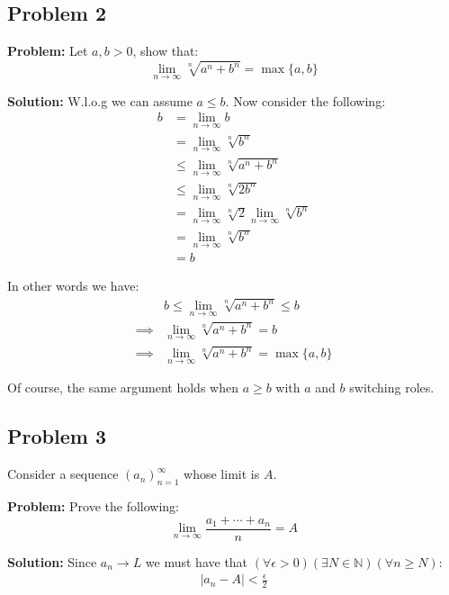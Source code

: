 \documentclass{article}
\newcommand{\N}{\mathbb N}
\begin{document}
\subsection*{Problem 2}
\noindent\textbf{Problem:} Let $a,b>0$, show that:
$$\lim_{n\to\infty}\sqrt[n]{a^n+b^n}=\max\{a,b\}$$

\noindent\textbf{Solution:} W.l.o.g we can assume $a\le b$. Now consider the following:
\begin{align*}
  b&=\lim_{n\to\infty}b\\
  &=\lim_{n\to\infty}\sqrt[n]{b^n}\\
  &\le\lim_{n\to\infty}\sqrt[n]{a^n+b^n}\tag{$a^n+b^n\ge b^n$}\\ 
  &\le\lim_{n\to\infty}\sqrt[n]{2b^n}\tag{$a<b$}\\
  &=\lim_{n\to\infty}\sqrt[n]{2}\lim_{n\to\infty}\sqrt[n]{b^n}\\
  &=\lim_{n\to\infty}\sqrt[n]{b^n}\tag{Problem 1, Part b}\\
  &=b
\end{align*}

In other words we have:
\begin{align*}
  &b\le \lim_{n\to\infty}\sqrt[n]{a^n+b^n}\le b\tag{see above}\\
  \implies&\lim_{n\to\infty}\sqrt[n]{a^n+b^n}=b\tag{squeeze theorem}\\
  \implies&\lim_{n\to\infty}\sqrt[n]{a^n+b^n}=\max\{a, b\}\tag{$a\le b$}
\end{align*}

Of course, the same argument holds when $a\ge b$ with $a$ and $b$ switching roles.

\subsection*{Problem 3}
Consider a sequence $(a_n)_{n=1}^\infty$ whose limit is $A$.
\bigskip

\noindent\textbf{Problem:} Prove the following:
\begin{equation*}
  \lim_{n\to\infty}\frac{a_1+\cdots+a_n}{n}=A
\end{equation*}
\medskip

\noindent\textbf{Solution:} Since $a_n\to L$ we must have that $(\forall \epsilon>0)(\exists N\in\N)(\forall n\ge N)$:
\begin{align*}
  |a_n-A|<\frac{\epsilon}{2}\tag{lemma 1}
\end{align*}
\end{document}
